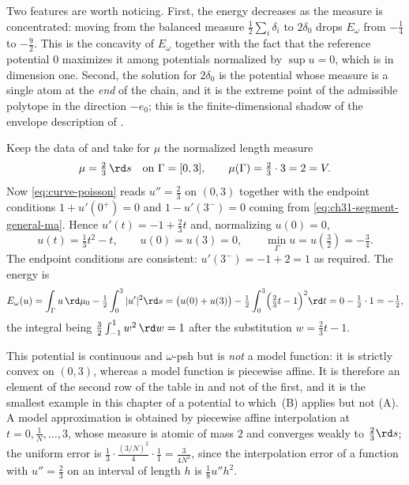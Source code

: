 \begin{example}
Two features are worth noticing.  First, the energy decreases as the measure
is concentrated: moving from the balanced measure
\(\tfrac12\sum_i\delta_i\) to \(2\delta_0\) drops \(E_\omega\) from
\(-\tfrac14\) to \(-\tfrac92\).  This is the concavity of \(E_\omega\)
together with the fact that the reference potential \(0\) maximizes it among
potentials normalized by \(\sup u=0\), which is
 in dimension one.  Second, the solution
for \(2\delta_0\) is the potential whose measure is a single atom at the
\emph{end} of the chain, and it is the extreme point of the admissible
polytope in the direction \(-e_0\); this is the finite-dimensional shadow of
the envelope description of .
\end{example}

\begin{example}
\label{ex:ch31-chain-lebesgue}
Keep the data of  and take for \(\mu\) the
normalized length measure
\[
 \mu=\tfrac23\,\rd s\quad\text{on }\Gamma=[0,3],
 \qquad \mu(\Gamma)=\tfrac23\cdot3=2=V .
\]
Now \eqref{eq:curve-poisson} reads \(u''=\tfrac23\) on \((0,3)\) together
with the endpoint conditions \(1+u'(0^+)=0\) and \(1-u'(3^-)=0\) coming from
\eqref{eq:ch31-segment-general-ma}.  Hence \(u'(t)=-1+\tfrac23t\) and,
normalizing \(u(0)=0\),
\begin{equation}
\label{eq:ch31-chain-lebesgue-potential}
 u(t)=\tfrac13t^2-t,
 \qquad u(0)=u(3)=0,
 \qquad \min_\Gamma u=u(\tfrac32)=-\tfrac34 .
\end{equation}
The endpoint conditions are consistent: \(u'(3^-)=-1+2=1\) as required.  The
energy is
\[
 E_\omega(u)=\int_\Gamma u\,\rd\mu_0-\tfrac12\int_0^3|u'|^2\rd s
 =\bigl(u(0)+u(3)\bigr)-\tfrac12\int_0^3\Bigl(\tfrac23t-1\Bigr)^2\rd t
 =0-\tfrac12\cdot1=-\tfrac12 ,
\]
the integral being \(\tfrac32\int_{-1}^{1}w^2\,\rd w=1\) after the
substitution \(w=\tfrac23t-1\).

This potential is continuous and \(\omega\)-psh but is \emph{not} a model
function: it is strictly convex on \((0,3)\), whereas a model function is
piecewise affine.  It is therefore an element of the second row of the table
in  and not of the first, and it is the
smallest example in this chapter of a potential to which
\,(B) applies but not (A).  A model
approximation is obtained by piecewise affine interpolation at
\(t=0,\tfrac1N,\ldots,3\), whose measure is atomic of mass \(2\) and
converges weakly to \(\tfrac23\rd s\); the uniform error is
\(\tfrac13\cdot\tfrac{(3/N)^2}{4}\cdot\tfrac{1}{1}=\tfrac{3}{4N^2}\), since
the interpolation error of a function with \(u''=\tfrac23\) on an interval
of length \(h\) is \(\tfrac{1}{8}u''h^2\).
\end{example}


